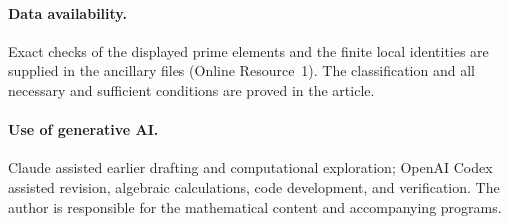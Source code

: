 \documentclass[11pt]{amsart}
\theoremstyle{plain}
\theoremstyle{definition}
\numberwithin{equation}{section}
\begin{document}
\paragraph{Data availability.}
Exact checks of the displayed prime elements and the finite local
identities are supplied in the ancillary files (Online Resource~1). The classification and
all necessary and sufficient conditions are proved in the article.

\paragraph{Use of generative AI.}
Claude assisted earlier drafting and computational exploration;
OpenAI Codex assisted revision, algebraic calculations, code development,
and verification. The author is responsible for the mathematical
content and accompanying programs.

\end{document}
